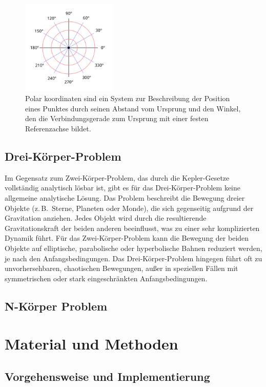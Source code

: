 \documentclass[a4paper,12pt,twoside]{article}
\begin{document}
\begin{figure}[H]
	\centering
	\includegraphics[width=0.4\textwidth]{Polarkoordinaten.svg.png}
	\caption[Eintrag in Abbildungsverzeichnis von Polarkoordinatsystem]{Polar koordinaten sind ein System zur Beschreibung der Position eines Punktes durch seinen Abstand vom Ursprung und den Winkel, den die Verbindungsgerade zum Ursprung mit einer festen Referenzachse bildet.}
	\label{polarkoordinatsystem.}
\end{figure}

\subsection{Drei-Körper-Problem}Im Gegensatz zum Zwei-Körper-Problem, das durch die Kepler-Gesetze vollständig analytisch lösbar ist, gibt es für das Drei-Körper-Problem keine allgemeine analytische Lösung. Das Problem beschreibt die Bewegung dreier Objekte (z.\,B.\ Sterne, Planeten oder Monde), die sich gegenseitig aufgrund der Gravitation anziehen. Jedes Objekt wird durch die resultierende Gravitationskraft der beiden anderen beeinflusst, was zu einer sehr komplizierten Dynamik führt.
Für das Zwei-Körper-Problem kann die Bewegung der beiden Objekte auf elliptische, parabolische oder hyperbolische Bahnen reduziert werden, je nach den Anfangsbedingungen. Das Drei-Körper-Problem hingegen führt oft zu unvorhersehbaren, chaotischen Bewegungen, außer in speziellen Fällen mit symmetrischen oder stark eingeschränkten Anfangsbedingungen.

\subsection{N-Körper Problem}

\section{Material und Methoden}
\subsection{Vorgehensweise und Implementierung}
\end{document}
